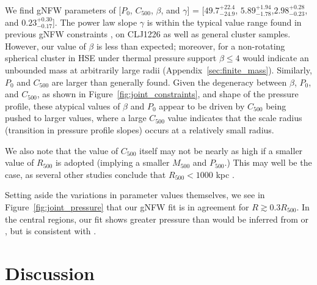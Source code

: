 \documentclass[twocolumn,traditabstract]{aa}
\begin{document}
We find gNFW parameters of [$P_0$, $C_{500}$, $\beta$, and $\gamma$] =
[$49.7_{-24.9}^{+22.4}$, $5.89_{-1.78}^{+1.94}$,$2.98_{-0.23}^{+0.28}$, and $0.23_{-0.17}^{+0.30}$].
The power law slope $\gamma$ is within the typical value range found in previous gNFW constraints
\citep[e.g]{nagai2007,arnaud2010,sayers2013},
on CLJ1226 as well as general cluster samples. However, our value of $\beta$ is less than expected;
moreover, for a non-rotating spherical cluster in HSE under thermal pressure support $\beta \le 4$ would
indicate an unbounded mass at arbitrarily large radii (Appendix~\ref{sec:finite_mass}).
Similarly, $P_0$ and $C_{500}$ are larger than generally found.
Given the degeneracy between $\beta$, $P_0$, and $C_{500}$, as shown in Figure~\ref{fig:joint_constraints},
and shape of the pressure profile, these atypical
values of $\beta$ and  $P_0$ appear to be driven by $C_{500}$ being pushed to larger values, where a large $C_{500}$
value indicates that the scale radius (transition in pressure profile slopes) occurs at a relatively small radius.

We also note that the value of $C_{500}$ itself may not be nearly as high if a smaller value of $R_{500}$
is adopted (implying a smaller $M_{500}$ and $P_{500}$.) This may well be the case, as several other
studies conclude that $R_{500} < 1000$ kpc \citep[e.g][]{rumsey2016,mroczkowski2009}.

Setting aside the variations in parameter values themselves, we see in Figure~\ref{fig:joint_pressure} that our
gNFW fit is in agreement for $R \gtrsim 0.3 R_{500}$. In the central regions, our fit shows greater pressure than
would be inferred from  or \citet{planck2013a}, but is consistent with \citet{romero2017}.

\section{Discussion}
\label{sec:discussion}
\end{document}
